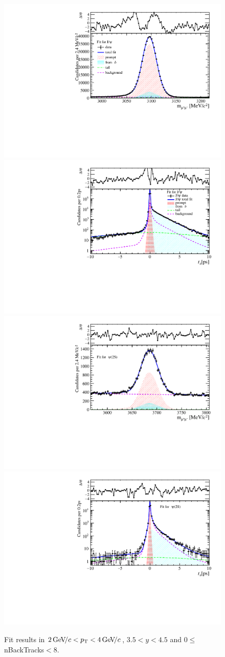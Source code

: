 \begin{figure}[H]
\begin{center}
\includegraphics[width=0.47\linewidth]{pdf/Jpsi/drawmassB/n1y3pt2.pdf}
\includegraphics[width=0.47\linewidth]{pdf/Jpsi/2DFitB/n1y3pt2.pdf}
\vspace*{-0.5cm}
\includegraphics[width=0.47\linewidth]{pdf/Psi2S/drawmassB/n1y3pt2.pdf}
\includegraphics[width=0.47\linewidth]{pdf/Psi2S/2DFitB/n1y3pt2.pdf}
\vspace*{-0.5cm}
\end{center}
\caption{Fit results in $2\text{\,Ge\kern -0.1em V\!/}c<p_{\mathrm{T}}<4\text{\,Ge\kern -0.1em V\!/}c$, $3.5<y<4.5$ and 0$\leq$nBackTracks$<$8.}
\label{Fitn1y3pt2}
\end{figure}
